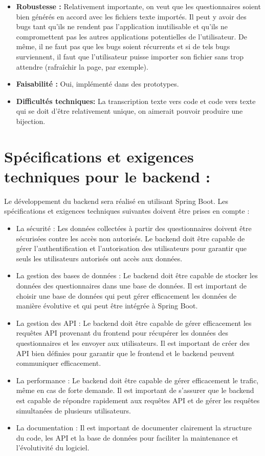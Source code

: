 \documentclass{article}
\begin{document}
\begin{enumerate}[noitemsep]
\begin{itemize}[noitemsep]
    \item \textbf{Robustesse : }Relativement importante, on veut que les questionnaires soient bien générés en accord avec les fichiers texte importés. Il peut y avoir des bugs tant qu'ils ne rendent pas l'application inutilisable et qu'ils ne compromettent pas les autres applications potentielles de l'utilisateur. De même, il ne faut pas que les bugs soient récurrents et si de tels bugs surviennent, il faut que l'utilisateur puisse importer son fichier sans trop attendre (rafraîchir la page, par exemple).
    \item \textbf{Faisabilité : }Oui, implémenté dans des prototypes.
    \item \textbf{Difficultés techniques: } La transcription texte vers code et code vers texte qui se doit d'être relativement unique, on aimerait pouvoir produire une bijection.
\end{itemize}
\end{enumerate}


\section{Spécifications et exigences techniques pour le backend :}

Le développement du backend sera réalisé en utilisant Spring Boot. Les spécifications et exigences techniques suivantes doivent être prises en compte :

\begin{itemize}[noitemsep]
\item La sécurité : Les données collectées à partir des questionnaires doivent être sécurisées contre les accès non autorisés. Le backend doit être capable de gérer l'authentification et l'autorisation des utilisateurs pour garantir que seuls les utilisateurs autorisés ont accès aux données.
\item La gestion des bases de données : Le backend doit être capable de stocker les données des questionnaires dans une base de données. Il est important de choisir une base de données qui peut gérer efficacement les données de manière évolutive et qui peut être intégrée à Spring Boot.
\item La gestion des API : Le backend doit être capable de gérer efficacement les requêtes API provenant du frontend pour récupérer les données des questionnaires et les envoyer aux utilisateurs. Il est important de créer des API bien définies pour garantir que le frontend et le backend peuvent communiquer efficacement.
\item La performance : Le backend doit être capable de gérer efficacement le trafic, même en cas de forte demande. Il est important de s'assurer que le backend est capable de répondre rapidement aux requêtes API et de gérer les requêtes simultanées de plusieurs utilisateurs.
\item La documentation : Il est important de documenter clairement la structure du code, les API et la base de données pour faciliter la maintenance et l'évolutivité du logiciel.
\end{itemize}
\end{document}
